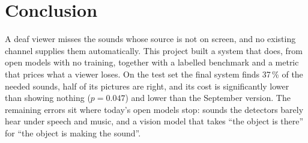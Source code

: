 \section{Conclusion}\label{sec:conclusion}

A deaf viewer misses the sounds whose source is not on screen, and no existing channel supplies them automatically.
This project built a system that does, from open models with no training, together with a labelled benchmark and a
metric that prices what a viewer loses. On the test set the final system finds 37\,\% of the needed sounds, half of its
pictures are right, and its cost is significantly lower than showing nothing ($p = 0.047$) and lower than the September
version. The remaining errors sit where today's open models stop: sounds the detectors barely hear under speech and
music, and a vision model that takes ``the object is there'' for ``the object is making the sound''.

